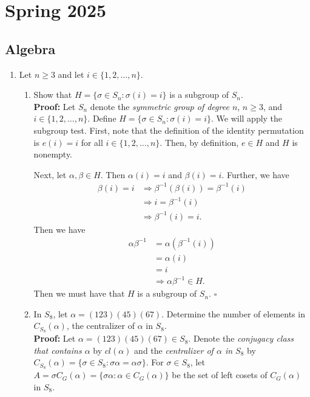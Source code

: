 \documentclass{article}
\begin{document}
\newpage

\section{Spring 2025}
\subsection{Algebra}

\begin{enumerate}
    \item Let $n \geq 3$ and let $i \in \{1,2, \dots, n\}$.
    \begin{enumerate}
        \item Show that $H = \{\sigma \in S_n: \sigma(i)=i\}$ is a subgroup of $S_n$.\\
        \textbf{Proof:} Let $S_n$ denote the \textit{symmetric group of degree $n$}, $n \geq 3$, and $i \in \{1,2, \dots, n\}$. Define 
        $H = \{\sigma \in S_n: \sigma(i)=i\}$. We will apply the subgroup test. First, note that the definition of the identity permutation 
        is $e(i)=i$ for all $i \in \{1,2, \dots, n\}$. Then, by definition, $e \in H$ and $H$ is nonempty.

        Next, let $\alpha, \beta \in H$. Then $\alpha(i)=i$ and $\beta(i)=i$. Further, we have
        \begin{align*}
            \beta(i)=i &\Longrightarrow \beta^{-1}(\beta(i)) = \beta^{-1}(i) \\
            &\Longrightarrow i = \beta^{-1}(i) \\
            &\Longrightarrow \beta^{-1}(i)=i.
        \end{align*}
        Then we have
        \begin{align*}
            \alpha \beta^{-1} &= \alpha(\beta^{-1}(i)) \\
            &= \alpha(i) \\
            &= i \\
            &\Longrightarrow \alpha \beta^{-1} \in H. 
        \end{align*}
        Then we must have that $H$ is a subgroup of $S_n$. $\square$
        \item In $S_8$, let $\alpha = (123)(45)(67)$. Determine the number of elements in $C_{S_8}(\alpha)$, the centralizer of $\alpha$ in 
        $S_8$. \\
        \textbf{Proof:} Let $\alpha = (123)(45)(67) \in S_8$. Denote the \textit{conjugacy class that contains $\alpha$} by $cl(\alpha)$ and 
        the \textit{centralizer of $\alpha$ in $S_8$} by $C_{S_8}(\alpha) = \{\sigma \in S_8: \sigma \alpha = \alpha \sigma\}$. For $\sigma 
        \in S_8$, let $A = \sigma C_G(\alpha) = \{\sigma \alpha: \alpha \in C_G(\alpha)\}$ be the set of left cosets of $C_G(\alpha)$ in $S_8$. 


\end{enumerate}
\end{enumerate}
\end{document}
